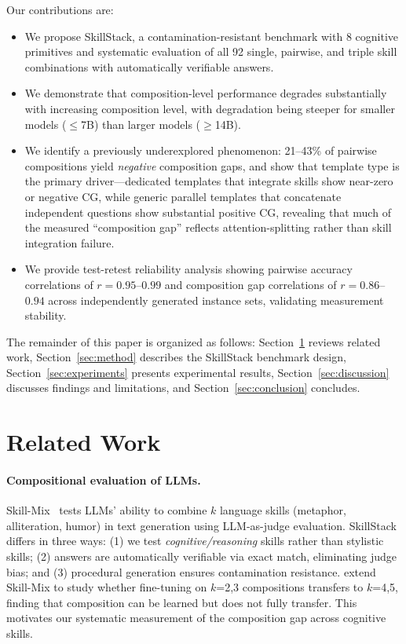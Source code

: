\documentclass{article}
\begin{document}
Our contributions are:
\begin{itemize}
    \item We propose SkillStack, a contamination-resistant benchmark with 8 cognitive primitives and systematic evaluation of all 92 single, pairwise, and triple skill combinations with automatically verifiable answers.
    \item We demonstrate that composition-level performance degrades substantially with increasing composition level, with degradation being steeper for smaller models ($\leq$7B) than larger models ($\geq$14B).
    \item We identify a previously underexplored phenomenon: 21--43\% of pairwise compositions yield \emph{negative} composition gaps, and show that template type is the primary driver---dedicated templates that integrate skills show near-zero or negative CG, while generic parallel templates that concatenate independent questions show substantial positive CG, revealing that much of the measured ``composition gap'' reflects attention-splitting rather than skill integration failure.
    \item We provide test-retest reliability analysis showing pairwise accuracy correlations of $r=0.95$--$0.99$ and composition gap correlations of $r=0.86$--$0.94$ across independently generated instance sets, validating measurement stability.
\end{itemize}

The remainder of this paper is organized as follows: Section~\ref{sec:related} reviews related work, Section~\ref{sec:method} describes the SkillStack benchmark design, Section~\ref{sec:experiments} presents experimental results, Section~\ref{sec:discussion} discusses findings and limitations, and Section~\ref{sec:conclusion} concludes.

\section{Related Work}
\label{sec:related}

\paragraph{Compositional evaluation of LLMs.}
Skill-Mix~\citep{yu2024skillmix} tests LLMs' ability to combine $k$ language skills (metaphor, alliteration, humor) in text generation using LLM-as-judge evaluation. SkillStack differs in three ways: (1) we test \emph{cognitive/reasoning} skills rather than stylistic skills; (2) answers are automatically verifiable via exact match, eliminating judge bias; and (3) procedural generation ensures contamination resistance. \citet{zhao2024canmodels} extend Skill-Mix to study whether fine-tuning on $k$=2,3 compositions transfers to $k$=4,5, finding that composition can be learned but does not fully transfer. This motivates our systematic measurement of the composition gap across cognitive skills.
\end{document}
